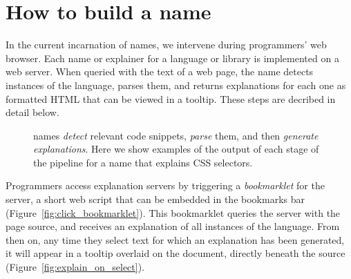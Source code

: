 \section{How to build a \gls{name}}

In the current incarnation of \glspl{name}, we intervene during programmers' web browser.
Each \gls{name} or explainer for a language or library is implemented on a web server.
When queried with the text of a web page, the \gls{name} detects instances of the language, parses them, and returns explanations for each one as formatted HTML that can be viewed in a tooltip.
These steps are decribed in detail below.

\begin{figure}
\caption{\Glspl{name} \emph{detect} relevant code snippets, \emph{parse} them, and then \emph{generate explanations}.  Here we show examples of the output of each stage of the pipeline for a \gls{name} that explains CSS selectors.}
\label{fig:explanation_pipeline}
\end{figure}

Programmers access explanation servers by triggering a \emph{bookmarklet} for the server, a short web script that can be embedded in the bookmarks bar (Figure~\ref{fig:click_bookmarklet}).
This bookmarklet queries the server with the page source, and receives an explanation of all instances of the language.
From then on, any time they select text for which an explanation has been generated, it will appear in a tooltip overlaid on the document, directly beneath the source (Figure~\ref{fig:explain_on_select}).

\begin{figure}
\end{figure}

